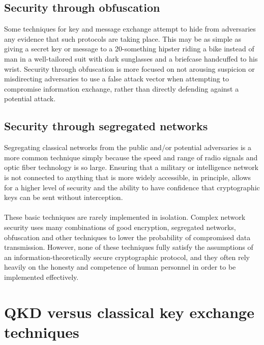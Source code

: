 \documentclass[aps,prl,twocolumn,10pt,nofootinbib]{revtex4}
\begin{document}
\subsection{Security through obfuscation}
Some techniques for key and message exchange attempt to hide from adversaries any evidence that such protocols are taking place.  This may be as simple as giving a secret key or message to a 20-something hipster riding a bike instead of man in a well-tailored suit with dark sunglasses and a briefcase handcuffed to his wrist.  Security through obfuscation is more focused on not arousing suspicion or misdirecting adversaries to use a false attack vector when attempting to compromise information exchange, rather than directly defending against a potential attack.  

\subsection{Security through segregated networks}

Segregating classical networks from the public and/or potential adversaries is a more common technique simply because the speed and range of radio signals and optic fiber technology is so large.  Ensuring that a military or intelligence network is not connected to anything that is more widely accessible, in principle, allows for a higher level of security and the ability to have confidence that cryptographic keys can be sent without interception.   
\\
\\
These basic techniques are rarely implemented in isolation.  Complex network security uses many combinations of good encryption, segregated networks, obfuscation and other techniques to lower the probability of compromised data transmission.  However, none of these techniques fully satisfy the assumptions of an information-theoretically secure cryptographic protocol, and they often rely heavily on the honesty and competence of human personnel in order to be implemented effectively.  
\\

\section{QKD versus classical key exchange techniques}
\end{document}
